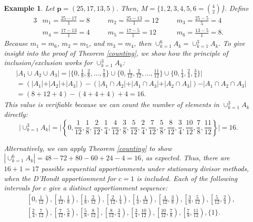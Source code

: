 \documentclass[pdflatex,sn-mathphys-num]{sn-jnl}
\theoremstyle{thmstyleone}%
\theoremstyle{thmstyletwo}%
\newtheorem{example}{Example}%
\theoremstyle{thmstylethree}%
\begin{document}
\begin{example} Let $\mathbf p = (25,17,13,5)$.  Then, $M = \{1, 2, 3, 4, 5, 6=\binom{4}{2}$\}.  Define
\begin{alignat*}{3}
&m_1 = \textstyle\frac{25-17}{1}=8 \quad &&m_2 =\textstyle\frac{25-13}{1} =12 \quad &&m_3 = \textstyle\frac{25-5}{5}=4 \\
&m_4 =\textstyle\frac{17-13}{1}=4 \quad &&m_5 = \textstyle\frac{17-5}{1}=12 \quad &&m_6 = \textstyle\frac{13-5}{1}=8. \end{alignat*}
Because $m_1 = m_6$, $m_2 = m_5$, and $m_3 = m_4$, then $\cup_{k=1}^6 A_k =\cup_{k=1}^3 A_k$.  To give insight into the proof of Theorem \ref{counting}, we show how the principle of inclusion/exclusion works for $\cup_{k=1}^3 A_k$:
\begin{align*}
&\vert A_1 \cup A_2 \cup A_3 \vert  = \vert \{0, \textstyle\frac{1}{8}, \textstyle\frac{2}{8}, \ldots, \textstyle\frac{7}{8} \} \cup \{0, \textstyle\frac{1}{12}, \textstyle\frac{2}{12}, \ldots, \textstyle\frac{11}{12} \} \cup \{0, \textstyle\frac{1}{4}, \textstyle\frac{2}{4}, \textstyle\frac{3}{4} \} \vert  \\
&= \left( \vert A_1 \vert + \vert A_2 \vert + \vert A_3 \vert \right) - \left( \vert A_1 \cap A_2 \vert + \vert A_1 \cap A_3 \vert + \vert A_2 \cap A_3 \vert \right) - \vert A_1 \cap A_2 \cap A_3 \vert \\
&= \left( 8+12 +4 \right) - \left( 4 + 4 + 4\right) + 4 = 16.\end{align*}
This value is verifiable because we can count the number of elements in $\cup_{k=1}^3 A_k$ directly:
$$\vert \cup_{k=1}^3 A_k \vert = \vert \textstyle{ \left\{ 0, \frac{1}{12}, \frac{1}{8}, \frac{2}{12}, \frac{1}{4}, \frac{4}{12}, \frac{3}{8}, \frac{5}{12}, \frac{2}{4}, \frac{7}{12}, \frac{5}{8}, \frac{8}{12}, \frac{3}{4}, \frac{10}{12}, \frac{7}{8}, \frac{11}{12} \right\}} \vert = 16.$$ 

Alternatively, we can apply Theorem \ref{counting} to show $\left\vert \cup_{k=1}^6 A_k \right\vert = 48 - 72 + 80 - 60 + 24 - 4 = 16$, as expected.  Thus, there are $16+ 1 = 17$ possible sequential apportionments under stationary divisor methods, when the D'Hondt apportionment for $c=1$ is included. Each of the following intervals for $c$ give a distinct apportionment sequence:
\begin{align*}
&\textstyle{ \left[ 0, \frac{1}{12} \right), \left[ \frac{1}{12}, \frac{1}{8} \right), \left[ \frac{1}{8}, \frac{2}{12} \right), 
\left[ \frac{2}{12}, \frac{1}{4} \right), \left[ \frac{1}{4}, \frac{4}{12} \right),  \left[  \frac{4}{12}, \frac{3}{8} \right), \left[ \frac{3}{8}, \frac{5}{12} \right), \left[ \frac{5}{12}, \frac{2}{4} \right),}\\
&\textstyle{ \left[ \frac{2}{4}, \frac{7}{12} \right),
\left[ \frac{7}{12}, \frac{5}{8} \right), \left[ \frac{5}{8}, \frac{8}{12} \right] ,
\left[ \frac{8}{12}, \frac{3}{4} \right), \left[ \frac{3}{4}, \frac{10}{12} \right), \left[ \frac{10}{12}, \frac{7}{8} \right), \left[ \frac{7}{8}, \frac{11}{12} \right), \{ 1 \}.} 
\end{align*}  \end{example}
\end{document}
